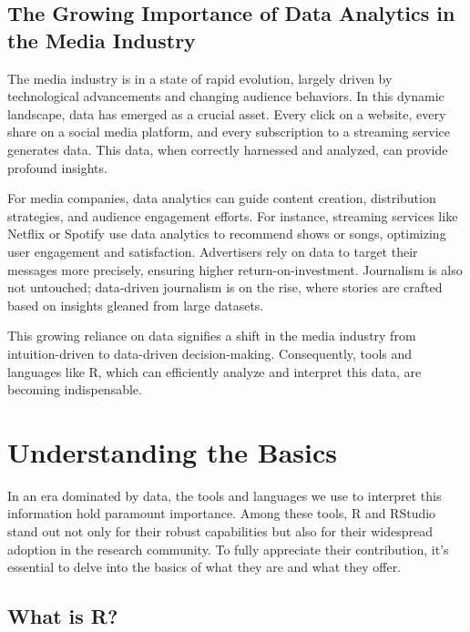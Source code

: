 \documentclass[
  b5paper]{book}
\begin{document}
\hypertarget{the-growing-importance-of-data-analytics-in-the-media-industry}{%
\subsection*{The Growing Importance of Data Analytics in the Media Industry}\label{the-growing-importance-of-data-analytics-in-the-media-industry}}

The media industry is in a state of rapid evolution, largely driven by technological advancements and changing audience behaviors. In this dynamic landscape, data has emerged as a crucial asset. Every click on a website, every share on a social media platform, and every subscription to a streaming service generates data. This data, when correctly harnessed and analyzed, can provide profound insights.

For media companies, data analytics can guide content creation, distribution strategies, and audience engagement efforts. For instance, streaming services like Netflix or Spotify use data analytics to recommend shows or songs, optimizing user engagement and satisfaction. Advertisers rely on data to target their messages more precisely, ensuring higher return-on-investment. Journalism is also not untouched; data-driven journalism is on the rise, where stories are crafted based on insights gleaned from large datasets.

This growing reliance on data signifies a shift in the media industry from intuition-driven to data-driven decision-making. Consequently, tools and languages like R, which can efficiently analyze and interpret this data, are becoming indispensable.

\hypertarget{understanding-the-basics}{%
\section{Understanding the Basics}\label{understanding-the-basics}}

In an era dominated by data, the tools and languages we use to interpret this information hold paramount importance. Among these tools, R and RStudio stand out not only for their robust capabilities but also for their widespread adoption in the research community. To fully appreciate their contribution, it's essential to delve into the basics of what they are and what they offer.

\hypertarget{what-is-r}{%
\subsection*{What is R?}\label{what-is-r}}
\end{document}
